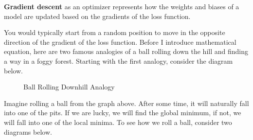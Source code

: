 \documentclass[../../../main.tex]{subfiles}
\begin{document}
\begin{definition}{}{}
\textbf{Gradient descent} as an optimizer represents how the weights
and biases of a model are updated based on the gradients of the loss
function.
\end{definition}

You would typically start from a random position to move in the
opposite direction of the gradient of the loss function.
Before I introduce mathematical equation, here are two famous
analogies of a ball rolling down the hill and finding a way in a
foggy forest. Starting with the first analogy, consider the
diagram below.

\begin{figure}[H]
\centering
{}
\caption{Ball Rolling Downhill Analogy}
\end{figure}

Imagine rolling a ball from the graph above. After some time, it will
naturally fall into one of the pits. If we are lucky, we will find
the global minimum, if not, we will fall into one of the local minima.
To see how we roll a ball, consider two diagrams below.
\end{document}
